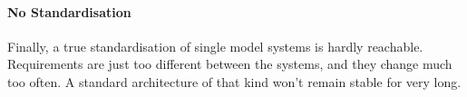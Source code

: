 %
%
%
%
%
%
%

\paragraph{No Standardisation}
\label{no_standardisation_heading}

Finally, a true standardisation of single model systems is hardly reachable.
Requirements are just too different between the systems, and they change much
too often. A standard architecture of that kind won't remain stable for very
long.
